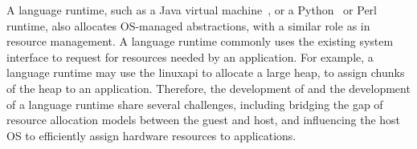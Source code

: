 A language runtime, such as a Java virtual machine~\cite{hotspot,j9,alpern2000jalapeno}, or a Python~\cite{python} or Perl~\cite{perl} runtime,
also allocates OS-managed abstractions,
with a similar role as \thelibos{} in resource management.
A language runtime commonly uses the existing system interface
to request for resources needed by an application.
For example, a language runtime may use the  linuxapi{} to allocate a large heap,
to assign chunks of the heap to an application.
Therefore, the development of \thelibos{} and the development of a language runtime share
several challenges,
including bridging the gap of resource allocation models
between the guest and host,
and influencing the host OS to efficiently assign hardware resources to applications.



